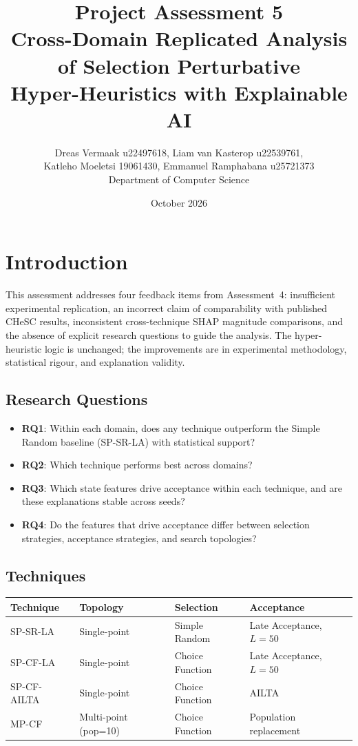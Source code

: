 \documentclass[11pt,a4paper]{article}
\title{\textbf{Project Assessment 5}\\
Cross-Domain Replicated Analysis of Selection Perturbative\\
Hyper-Heuristics with Explainable AI}
\author{Dreas Vermaak u22497618, Liam van Kasterop u22539761,\\
Katleho Moeletsi 19061430, Emmanuel Ramphabana u25721373\\
Department of Computer Science}
\date{October 2026}
\begin{document}
\maketitle

\section{Introduction}

This assessment addresses four feedback items from Assessment~4: insufficient
experimental replication, an incorrect claim of comparability with published
CHeSC results, inconsistent cross-technique SHAP magnitude comparisons, and
the absence of explicit research questions to guide the analysis. The
hyper-heuristic logic is unchanged; the improvements are in experimental
methodology, statistical rigour, and explanation validity.

\subsection{Research Questions}

\begin{itemize}
  \item \textbf{RQ1}: Within each domain, does any technique outperform the Simple Random baseline (SP-SR-LA) with statistical support?
  \item \textbf{RQ2}: Which technique performs best across domains?
  \item \textbf{RQ3}: Which state features drive acceptance within each technique, and are these explanations stable across seeds?
  \item \textbf{RQ4}: Do the features that drive acceptance differ between selection strategies, acceptance strategies, and search topologies?
\end{itemize}

\subsection{Techniques}

\begin{table}[H]
\centering
\begin{tabular}{llll}
\toprule
Technique & Topology & Selection & Acceptance \\
\midrule
SP-SR-LA & Single-point & Simple Random & Late Acceptance, $L{=}50$ \\
SP-CF-LA & Single-point & Choice Function & Late Acceptance, $L{=}50$ \\
SP-CF-AILTA & Single-point & Choice Function & AILTA \\
MP-CF & Multi-point (pop=10) & Choice Function & Population replacement \\
\bottomrule
\end{tabular}
\end{table}
\end{document}
